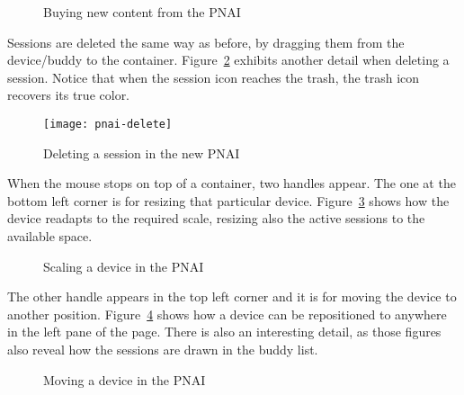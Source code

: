 \begin{figure}[htbp]
  \centering
  \caption{Buying new content from the PNAI}
  \label{fig:pnai-buy-content}
\end{figure}

Sessions are deleted the same way as before, by dragging them from the device/buddy to the container.
Figure~\ref{fig:pnai-delete} exhibits another detail when deleting a session.
Notice that when the session icon reaches the trash, the trash icon recovers its true color.

\begin{figure}[htbp]
  \centering
    \texttt{[image: pnai-delete]}
  \caption{Deleting a session in the new PNAI}
  \label{fig:pnai-delete}
\end{figure}

When the mouse stops on top of a container, two handles appear.
The one at the bottom left corner is for resizing that particular device.
Figure~\ref{fig:pnai-scale} shows how the device readapts to the required scale, resizing also the active sessions to the available space.

\begin{figure}[htbp]
  \centering
  \caption{Scaling a device in the PNAI}
  \label{fig:pnai-scale}
\end{figure}

The other handle appears in the top left corner and it is for moving the device to another position.
Figure~\ref{fig:pnai-move} shows how a device can be repositioned to anywhere in the left pane of the page.
There is also an interesting detail, as those figures also reveal how the sessions are drawn in the buddy list.

\begin{figure}[htbp]
  \centering
  \caption{Moving a device in the PNAI}
  \label{fig:pnai-move}
\end{figure}

